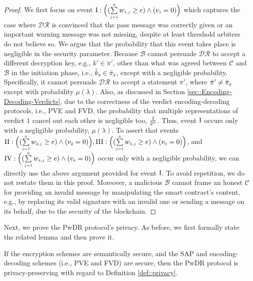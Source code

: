 \begin{proof}
%
We first focus on event $\text{\MakeUppercase{\romannumeral 1}}: \Big( (\sum\limits_{\st j=1}^{\st n}w_{\st 1,j}\geq e) \wedge ( v_{\st 1}=0)\Big)$ which captures the case where  $\mathcal{DR}$ is convinced that the pass message was correctly given or an important warning message was not missing, despite at least threshold arbiters do not believe so. We argue that the probability that this event takes place is negligible in the security parameter. Because $\mathcal{B}$ cannot persuade $\mathcal{DR}$ to accept a different decryption key, e.g., $k'\in \ddot\pi'$, other than what was agreed between $\mathcal{C}$ and $\mathcal{B}$ in the initiation phase, i.e., $\bar k_{\scriptscriptstyle 2}\in \ddot\pi_{\scriptscriptstyle 2}$, except with a negligible probability. Specifically, it cannot persuade  $\mathcal{DR}$ to accept a statement $\ddot \pi'$, where $\ddot \pi'\neq \ddot \pi_{\scriptscriptstyle 2}$ except with   probability $\mu(\lambda)$. Also, as discussed in Section \ref{sec::Encoding-Decoding-Verdicts}, due to the correctness of the verdict encoding-decoding protocols, i.e., PVE and FVD, the probability that multiple representations of verdict  $1$ cancel out each other is negligible too, $\frac{1}{2^{\scriptscriptstyle \lambda}}$. Thus,  event $\text{\MakeUppercase{\romannumeral 1}}$ occurs only with a negligible probability, $\mu(\lambda)$. To  assert that   events $\text{\MakeUppercase{\romannumeral 2}}: \Big(( \sum\limits_{\st j=1}^{\st n}w_{\st 2,j}\geq e) \wedge ( v_{\st 2}=0)\Big), \text{\MakeUppercase{\romannumeral 3}}: \Big(( \sum\limits_{\st j=1}^{\st n}w_{\st 3,j}\geq e) \wedge ( v_{\st 3}=0)\Big)$, and $\text{\MakeUppercase{\romannumeral 4}}: \Big(( \sum\limits_{\st j=1}^{\st n}w_{\st 4,j}\geq e) \wedge ( v_{\st 4}=0)\Big)$ occur only with a  negligible probability, we can directly use the above argument provided for event $\text{\MakeUppercase{\romannumeral 1}}$. To avoid repetition, we do not restate them in this proof.  Moreover, a malicious $\mathcal{B}$ cannot frame an honest $\mathcal{C}$ for providing an invalid message by manipulating the smart contract’s content,  e.g., by replacing its valid signature with an invalid one or sending a message on its behalf, due to the security of the blockchain.
\end{proof}


Next, we prove the PwDR protocol's privacy. As before, we first formally state the related lemma and then prove it. 


\begin{lemma}\label{lemma::privacy}
If the encryption schemes are semantically secure, and the SAP and encoding-decoding schemes (i.e., PVE and FVD)  are secure, then the PwDR protocol is privacy-preserving with regard to Definition \ref{def::privacy}.  
\end{lemma}

